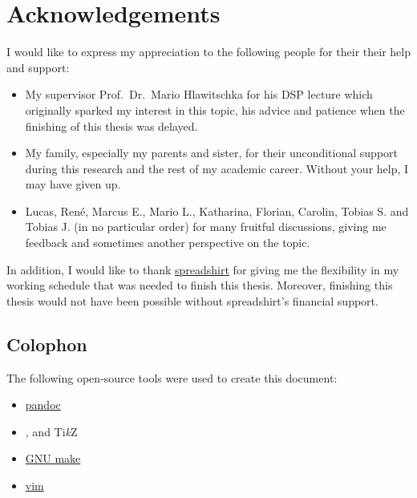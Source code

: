 \chapter*{Acknowledgements}

I would like to express my appreciation to the following people for their their help and support:

\begin{itemize}
\item My supervisor Prof.~Dr.~Mario Hlawitschka for his DSP lecture which originally sparked my interest in this topic, his advice and patience when the finishing of this thesis was delayed.
\item My family, especially my parents and sister, for their unconditional support during this research and the rest of my academic career. Without your help, I may have given up.
\item Lucas, René, Marcus E., Mario L., Katharina, Florian, Carolin, Tobias S. and Tobias J. (in no particular order) for many fruitful discussions, giving me feedback and sometimes another perspective on the topic.
\end{itemize}

In addition, I would like to thank \href{https://www.spreadshirt.net/}{spreadshirt} for giving me the flexibility in my working schedule that was needed to finish this thesis.
Moreover, finishing this thesis would not have been possible without spreadshirt's financial support.

\section*{Colophon}

The following open-source tools were used to create this document:

\begin{itemize}
\item \href{https://pandoc.org}{pandoc}
\item \LaTeXe{}, \XeLaTeX{} and Ti\textit{k}Z
\item \href{https://www.gnu.org/software/make}{GNU make}
\item \href{https://www.vim.org}{vim}
\end{itemize}

